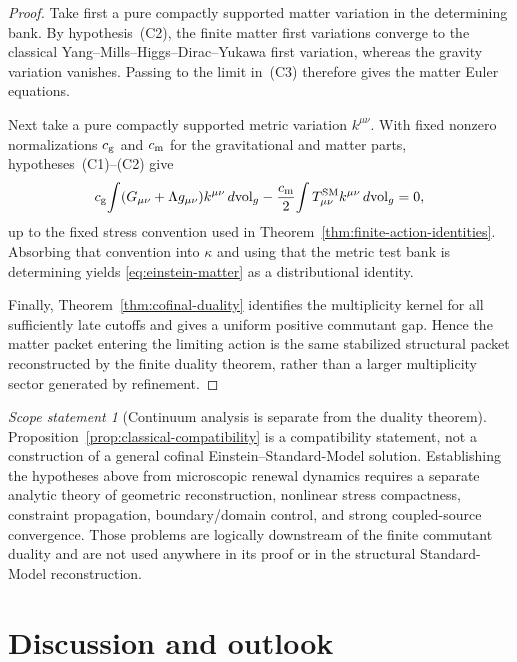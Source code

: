 \documentclass[11pt]{article}
\theoremstyle{definition}
\theoremstyle{remark}
\newtheorem{scope}[theorem]{Scope statement}
\begin{document}
\begin{proof}
Take first a pure compactly supported matter variation in the determining
bank.  By hypothesis~\textup{(C2)}, the finite matter first variations converge
to the classical Yang--Mills--Higgs--Dirac--Yukawa first variation, whereas the
gravity variation vanishes.  Passing to the limit in~\textup{(C3)} therefore
gives the matter Euler equations.

Next take a pure compactly supported metric variation $k^{\mu\nu}$.  With
fixed nonzero normalizations $c_{\rm g}$ and $c_{\rm m}$ for the gravitational
and matter parts, hypotheses~\textup{(C1)}--\textup{(C2)} give
\[
 c_{\rm g}\!\int
 (G_{\mu\nu}+\Lambda g_{\mu\nu})k^{\mu\nu}\,d{\rm vol}_g
 -\frac{c_{\rm m}}2\!\int
 T_{\mu\nu}^{\rm SM}k^{\mu\nu}\,d{\rm vol}_g=0,
\]
up to the fixed stress convention used in
Theorem~\ref{thm:finite-action-identities}.  Absorbing that convention into
$\kappa$ and using that the metric test bank is determining yields
\eqref{eq:einstein-matter} as a distributional identity.

Finally, Theorem~\ref{thm:cofinal-duality} identifies the multiplicity kernel
for all sufficiently late cutoffs and gives a uniform positive commutant gap.
Hence the matter packet entering the limiting action is the same stabilized
structural packet reconstructed by the finite duality theorem, rather than a
larger multiplicity sector generated by refinement.
\end{proof}

\begin{scope}[Continuum analysis is separate from the duality theorem]
Proposition~\ref{prop:classical-compatibility} is a compatibility statement,
not a construction of a general cofinal Einstein--Standard-Model solution.
Establishing the hypotheses above from microscopic renewal dynamics requires a
separate analytic theory of geometric reconstruction, nonlinear stress
compactness, constraint propagation, boundary/domain control, and strong
coupled-source convergence.  Those problems are logically downstream of the
finite commutant duality and are not used anywhere in its proof or in the
structural Standard-Model reconstruction.
\end{scope}

\section{Discussion and outlook}
\label{sec:discussion}
\end{document}
